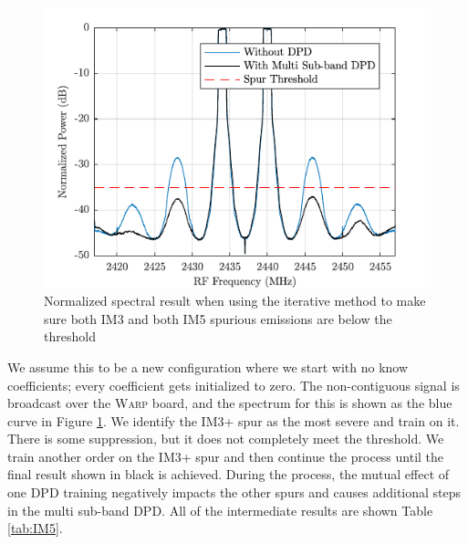  \begin{figure}
 	\centering
 	\includegraphics[]{Figures/IM5Spectrum}
 	\caption{Normalized spectral result when using the iterative method to make sure both IM3 and both IM5 spurious emissions are below the threshold}
 	\label{fig:IM5}
 \end{figure}
 
 We assume this to be a new configuration where we start with no know coefficients; every coefficient gets initialized to zero. The non-contiguous signal is broadcast over the \textsc{Warp} board, and the spectrum for this is shown as the blue curve in Figure \ref{fig:IM5}. We identify the IM3+ spur as the most severe and train on it. There is some suppression, but it does not completely meet the threshold. We train another order on the IM3+ spur and then continue the process until the final result shown in black is achieved. During the process, the mutual effect of one DPD training negatively impacts the other spurs and causes additional steps in the multi sub-band DPD. All of the intermediate results are shown Table \ref{tab:IM5}.
 
